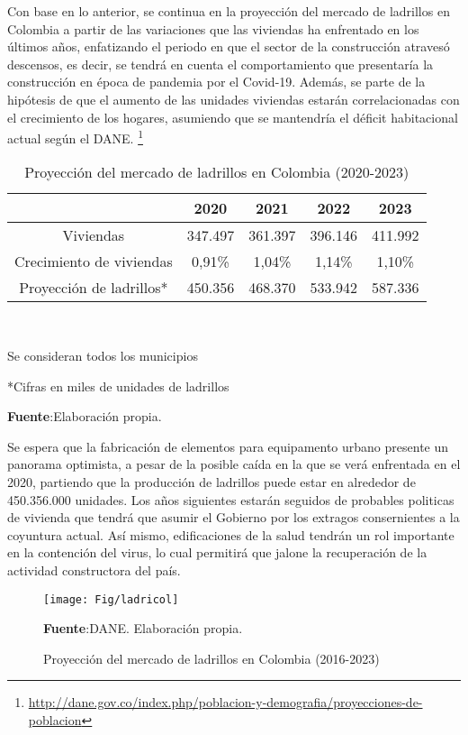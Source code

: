 \documentclass[12pt]{article}
\begin{document}
Con base en lo anterior, se continua en la proyección del mercado de ladrillos en Colombia a partir de las variaciones que las viviendas ha enfrentado en los últimos años, enfatizando el periodo en que el sector de la construcción atravesó descensos, es decir, se tendrá en cuenta el comportamiento que presentaría la construcción en época de pandemia por el Covid-19. Además,  se parte de la hipótesis de que el aumento de las unidades viviendas estarán correlacionadas con el crecimiento de los hogares, asumiendo que se mantendría el déficit habitacional actual según el DANE. \footnote{\url{ http://dane.gov.co/index.php/poblacion-y-demografia/proyecciones-de-poblacion}} 

\begin{table}[H]
  \centering
  \caption{Proyección del mercado de ladrillos en Colombia (2020-2023)}
    \begin{tabular}{c c c c c}
          \hline
          & 2020  & 2021  & 2022  & 2023 \\
          \hline
          \hline
  Viviendas & 347.497& 361.397 & 396.146 & 411.992 \\
    Crecimiento de viviendas & 0,91\%  & 1,04\%     & 1,14\%  & 1,10\% \\
    Proyección de ladrillos* & 450.356 & 468.370 & 533.942 & 587.336 \\
    \hline
    \end{tabular} \\
    \raggedright  \scriptsize *Se consideran todos los municipios\\
    \raggedright  \scriptsize **Cifras en miles de unidades de ladrillos\\
\raggedright  \scriptsize \textbf{Fuente}:Elaboración propia.
\label{c4}%
\end{table}%

Se espera que la fabricación de elementos para equipamento urbano presente un panorama optimista, a pesar de la posible caída en la que se verá enfrentada en el 2020, partiendo que la producción de ladrillos puede estar en alrededor de 450.356.000 unidades.  Los años siguientes estarán seguidos de probables politicas de vivienda que tendrá que asumir el Gobierno por los extragos consernientes a la coyuntura actual. Así mismo, edificaciones de la salud tendrán un rol importante en la contención del virus, lo cual permitirá que jalone la recuperación de la actividad constructora del país.


\begin{figure}[H]
  	\centering 		
  	\caption{Proyección del mercado de ladrillos en Colombia (2016-2023)}
	\texttt{[image: Fig/ladricol]}
\raggedright  \scriptsize \textbf{Fuente}:DANE. Elaboración propia.
	\label{6}	
	\end{figure}
\end{document}
